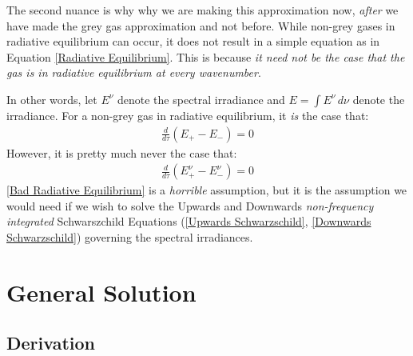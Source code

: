 The second nuance is why why we are making this approximation now, \textit{after} we have made the grey gas approximation and not before. While non-grey gases in radiative equilibrium can occur, it does not result in a simple equation as in Equation \ref{Radiative Equilibrium}. This is because \textit{it need not be the case that the gas is in radiative equilibrium at every wavenumber}. 

In other words, let $E^\nu$ denote the spectral irradiance and $E=\int E^\nu\,d\nu$ denote the irradiance. For a non-grey gas in radiative equilibrium, it \textit{is} the case that:
\begin{align*}
    \frac{d}{d\tau}(E_+-E_-)=0
\end{align*}
However, it is pretty much never the case that:
\begin{align}\label{Bad Radiative Equilibrium}
    \frac{d}{d\tau}(E^\nu_{+}-E^\nu_-)=0
\end{align}
\ref{Bad Radiative Equilibrium} is a \textit{horrible} assumption, but it is the assumption we would need if we wish to solve the Upwards and Downwards \textit{non-frequency integrated} Schwarszchild Equations (\ref{Upwards Schwarzschild}, \ref{Downwards Schwarzschild}) governing the spectral irradiances.



\section{General Solution}

\subsection{Derivation}

